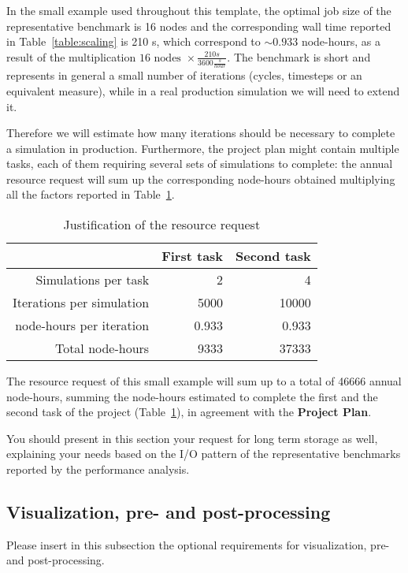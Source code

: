 \documentclass[11pt]{article}
\begin{document}
In the small example used throughout this template, the optimal job size of the representative 
benchmark is 16 nodes and the corresponding wall time reported in Table~\ref{table:scaling} is 
210 s, which correspond to $\sim 0.933$ node-hours, as a result of the multiplication 
$16 \mbox { nodes } \times \frac{210 s}{3600 \frac{s}{hour}}$. 
The benchmark is short and represents in general a small number of iterations (cycles, timesteps or 
an equivalent measure), while in a real production simulation we will need to extend it.

Therefore we will estimate how many iterations should be necessary to complete a simulation 
in production. Furthermore, the project plan might contain multiple tasks, each of them requiring 
several sets of simulations to complete: the annual resource request will sum up the corresponding 
node-hours obtained multiplying all the factors reported in Table~\ref{table:resource_request}. 
\begin{table}[H]
 \begin{center}
  \begin{tabular}{@{}*3{r}@{}}
   \hline \hline
   & First task & Second task \\ 
   \hline \hline
   Simulations per task & 2 & 4 \\
   Iterations per simulation & 5000 & 10000 \\
   node-hours per iteration & 0.933 & 0.933 \\
   Total node-hours & 9333 & 37333 \\
   \hline \hline
  \end{tabular}
 \end{center}
 \caption{Justification of the resource request}
 \label{table:resource_request}
\end{table}
The resource request of this small example will sum up to a total of 46666 annual node-hours, 
summing the node-hours estimated to complete the first and the second task of the project 
(Table~\ref{table:resource_request}), in agreement with the \textbf{Project Plan}.

You should present in this section your request for long term storage as well, explaining your needs 
based on the I/O pattern of the representative benchmarks reported by the performance analysis. 
 
\subsection{Visualization, pre- and post-processing}
Please insert in this subsection the optional requirements for visualization, pre- and post-processing.
\end{document}
